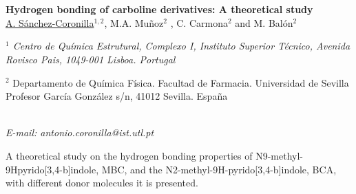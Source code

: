 \section*{}
\begin{center}
{\bf \Large
Hydrogen bonding of carboline derivatives: A theoretical
study
}
\\
\vspace{0.5cm}
\underline{A. Sánchez-Coronilla}$^{1,2}$, M.A. Muñoz$^{2}$ , C. Carmona$^{2}$ and M. Balón$^{2}$
\\
\vspace{0.5cm}
{\it
$^{1}$ Centro de Química Estrutural, Complexo I, Instituto Superior Técnico, Avenida Rovisco Pais,
1049-001 Lisboa. Portugal

$^{2}$ Departamento de Química Física. Facultad de Farmacia. Universidad de Sevilla
Profesor García González s/n, 41012 Sevilla. España
}
\\
\vspace{0.5cm}
{\it E-mail: antonio.coronilla@ist.utl.pt}
\\
\vspace{0.5cm}
\end{center}
A theoretical study on the hydrogen bonding properties of N9-methyl-9Hpyrido[3,4-b]indole, MBC,
and the N2-methyl-9H-pyrido[3,4-b]indole, BCA, with
different donor molecules it is presented.

